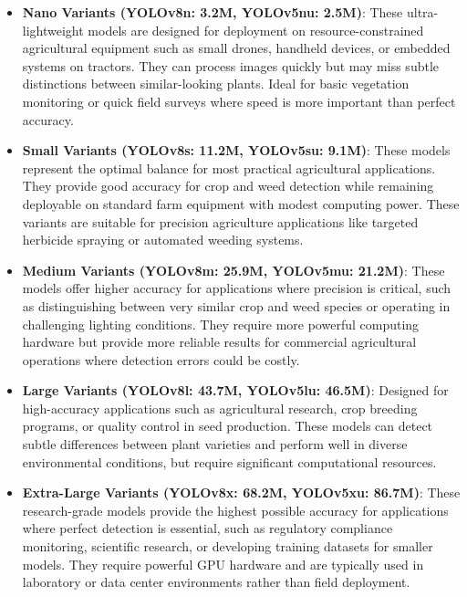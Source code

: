 \begin{itemize}
    \item \textbf{Nano Variants (YOLOv8n: 3.2M, YOLOv5nu: 2.5M)}: These ultra-lightweight models are designed for deployment on resource-constrained agricultural equipment such as small drones, handheld devices, or embedded systems on tractors. They can process images quickly but may miss subtle distinctions between similar-looking plants. Ideal for basic vegetation monitoring or quick field surveys where speed is more important than perfect accuracy.
    
    \item \textbf{Small Variants (YOLOv8s: 11.2M, YOLOv5su: 9.1M)}: These models represent the optimal balance for most practical agricultural applications. They provide good accuracy for crop and weed detection while remaining deployable on standard farm equipment with modest computing power. These variants are suitable for precision agriculture applications like targeted herbicide spraying or automated weeding systems.
    
    \item \textbf{Medium Variants (YOLOv8m: 25.9M, YOLOv5mu: 21.2M)}: These models offer higher accuracy for applications where precision is critical, such as distinguishing between very similar crop and weed species or operating in challenging lighting conditions. They require more powerful computing hardware but provide more reliable results for commercial agricultural operations where detection errors could be costly.
    
    \item \textbf{Large Variants (YOLOv8l: 43.7M, YOLOv5lu: 46.5M)}: Designed for high-accuracy applications such as agricultural research, crop breeding programs, or quality control in seed production. These models can detect subtle differences between plant varieties and perform well in diverse environmental conditions, but require significant computational resources.
    
    \item \textbf{Extra-Large Variants (YOLOv8x: 68.2M, YOLOv5xu: 86.7M)}: These research-grade models provide the highest possible accuracy for applications where perfect detection is essential, such as regulatory compliance monitoring, scientific research, or developing training datasets for smaller models. They require powerful GPU hardware and are typically used in laboratory or data center environments rather than field deployment.
\end{itemize}

